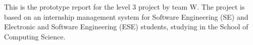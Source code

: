 

This is the prototype report for the level 3 project by team W. The project is based on an internship management system for Software Engineering (SE) and Electronic and Software Engineering (ESE) students, studying in the School of Computing Science.